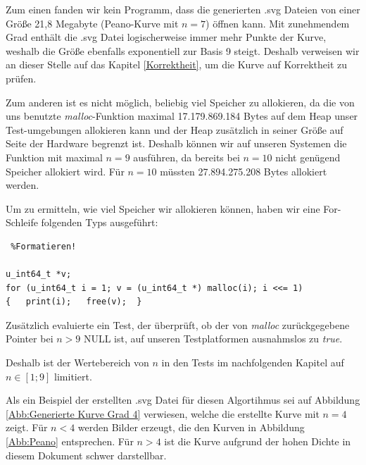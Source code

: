 \documentclass[course=asp]{aspdoc}
\begin{document}
Zum einen fanden wir kein Programm, dass die generierten .svg Dateien von einer Gr\"o\ss e 21,8 Megabyte (Peano-Kurve mit $n = 7$) \"offnen kann. Mit zunehmendem Grad enth\"alt die .svg Datei logischerweise immer mehr Punkte der Kurve, weshalb die Gr\"o\ss e ebenfalls exponentiell zur Basis 9 steigt. Deshalb verweisen wir an dieser Stelle auf das Kapitel \ref{Korrektheit}, um die Kurve auf Korrektheit zu pr\"ufen. 

Zum anderen ist es nicht m\"oglich, beliebig viel Speicher zu allokieren, da die von uns benutzte \textit{malloc}-Funktion maximal 17.179.869.184 Bytes auf dem Heap unser Test-umgebungen allokieren kann und der Heap zus\"atzlich in seiner Gr\"o\ss e auf Seite der Hardware begrenzt ist. Deshalb k\"onnen wir auf unseren Systemen die Funktion mit maximal $n = 9$ ausf\"uhren, da bereits bei $n = 10$ nicht gen\"ugend Speicher allokiert wird. F\"ur $n = 10$ m\"ussten 27.894.275.208 Bytes allokiert werden. 

Um zu ermitteln, wie viel Speicher wir allokieren k\"onnen, haben wir eine For-Schleife folgenden Typs ausgef\"uhrt:

\begin{lstlisting} %Formatieren! 

u_int64_t *v;
for (u_int64_t i = 1; v = (u_int64_t *) malloc(i); i <<= 1)
{   print(i);   free(v);  }
\end{lstlisting}

Zus\"atzlich evaluierte ein Test, der \"uberpr\"uft, ob der von \textit{malloc} zur\"uckgegebene Pointer bei $n > 9$ NULL ist, auf unseren Testplatformen ausnahmslos zu \textit{true}. %

Deshalb ist der Wertebereich von $n$ in den Tests im nachfolgenden Kapitel auf $ n \in [1;9]$ limitiert.

Als ein Beispiel der erstellten .svg Datei f\"ur diesen Algortihmus sei auf Abbildung \ref{Abb:Generierte Kurve Grad 4} verwiesen, welche die erstellte Kurve mit $n = 4$ zeigt. F\"ur $n < 4$ werden Bilder erzeugt, die den Kurven in Abbildung \ref{Abb:Peano} entsprechen. F\"ur $n > 4$ ist die Kurve aufgrund der hohen Dichte in diesem Dokument schwer darstellbar.
\end{document}
